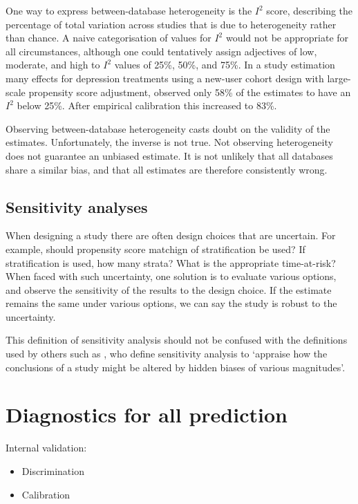 \documentclass[11pt]{book}
\providecommand{\tightlist}{%
  \setlength{\itemsep}{0pt}\setlength{\parskip}{0pt}}
\let\BeginKnitrBlock\begin \let\EndKnitrBlock\end
\begin{document}
One way to express between-database heterogeneity is the \(I^2\) score,
describing the percentage of total variation across studies that is due
to heterogeneity rather than chance. \citep{higgins_2003} A naive
categorisation of values for \(I^2\) would not be appropriate for all
circumstances, although one could tentatively assign adjectives of low,
moderate, and high to \(I^2\) values of 25\%, 50\%, and 75\%. In a study
estimation many effects for depression treatments using a new-user
cohort design with large-scale propensity score adjustment,
\citet{schuemie_2018b} observed only 58\% of the estimates to have an
\(I^2\) below 25\%. After empirical calibration this increased to 83\%.

\BeginKnitrBlock{rmdimportant}
Observing between-database heterogeneity casts doubt on the validity of
the estimates. Unfortunately, the inverse is not true. Not observing
heterogeneity does not guarantee an unbiased estimate. It is not
unlikely that all databases share a similar bias, and that all estimates
are therefore consistently wrong.
\EndKnitrBlock{rmdimportant}

\subsection{Sensitivity analyses}\label{sensitivity-analyses}

When designing a study there are often design choices that are
uncertain. For example, should propensity score matchign of
stratification be used? If stratification is used, how many strata? What
is the appropriate time-at-risk? When faced with such uncertainty, one
solution is to evaluate various options, and observe the sensitivity of
the results to the design choice. If the estimate remains the same under
various options, we can say the study is robust to the uncertainty.

This definition of sensitivity analysis should not be confused with the
definitions used by others such as \citet{rosenbaum_2005}, who define
sensitivity analysis to `appraise how the conclusions of a study might
be altered by hidden biases of various magnitudes'.

\section{Diagnostics for all
prediction}\label{diagnostics-for-all-prediction}

Internal validation:

\begin{itemize}
\tightlist
\item
  Discrimination
\item
  Calibration
\end{itemize}
\end{document}

